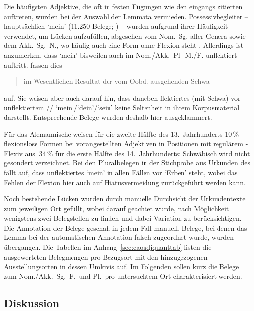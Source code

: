 Die häufigsten Adjektive, die oft in festen Fügungen wie den eingangs zitierten
auftreten, wurden bei der Auswahl der Lemmata vermieden. Possessivbegleiter --
hauptsächlich  `mein' (11.250 Belege; \cite[1231--1232]{wmu2}) --
wurden aufgrund ihrer Häufigkeit verwendet, um Lücken aufzufüllen, abgesehen vom
Nom.\ Sg. aller Genera sowie dem Akk.\ Sg.\ N., wo häufig auch eine Form ohne
Flexion steht \autocites[216]{paul2007}[507, 510--511]{ksw2}. Allerdings ist
anzumerken, dass  `mein' bisweilen auch im Nom./Akk.\ Pl.\ M./F.
unflektiert auftritt. \citet[510]{ksw2} fassen dies \blockquote{im Wesentlichen
 Resultat der vom Oobd. ausgehenden Schwa-} auf. Sie
weisen aber auch darauf hin, dass daneben flektiertes  (mit Schwa)
vor unflektiertem // `mein'/`dein'/`sein' keine
Seltenheit in ihrem Korpusmaterial darstellt. Entsprechende Belege wurden
deshalb hier ausgeklammert.

Für das Alemannische weisen \citet[271, Abbildung~A~47]{ksw2}
für die zweite Hälfte des 13.~Jahrhunderts 10\,\% flexionslose Formen bei
vorangestellten Adjektiven in Positionen mit regulärem -Flexiv aus,
34\,\% für die erste Hälfte des 14.~Jahrhunderts; Schwäbisch
wird nicht gesondert verzeichnet. Bei den Pluralbelegen in der Stichprobe aus
Urkunden des \CAO{} fällt auf, dass unflektiertes  `mein' in allen
Fällen vor  `Erben' steht, wobei das Fehlen der Flexion hier auch
auf Hiatusvermeidung zurückgeführt werden kann.

Noch bestehende Lücken wurden durch manuelle Durchsicht der Urkundentexte zum
jeweiligen Ort gefüllt, wobei darauf geachtet wurde, nach Möglichkeit wenigstens
zwei Belegstellen zu finden und dabei Variation zu berücksichtigen. Die
Annotation der Belege geschah in jedem Fall manuell. Belege, bei
denen das Lemma bei der automatischen Annotation falsch
zugeordnet wurde, wurden übergangen. Die Tabellen im
Anhang~\ref{sec:caoadjquanttab} listen die ausgewerteten Belegmengen pro
Bezugsort mit den hinzugezogenen Ausstellungs\-orten in dessen Umkreis auf. Im
Folgenden sollen kurz die Belege zum Nom./Akk.\ Sg.\ F.\ und Pl.\ pro
untersuchtem Ort charakterisiert werden.

\subsection{Diskussion}
\label{subsec:cao_adjflex_disc}

